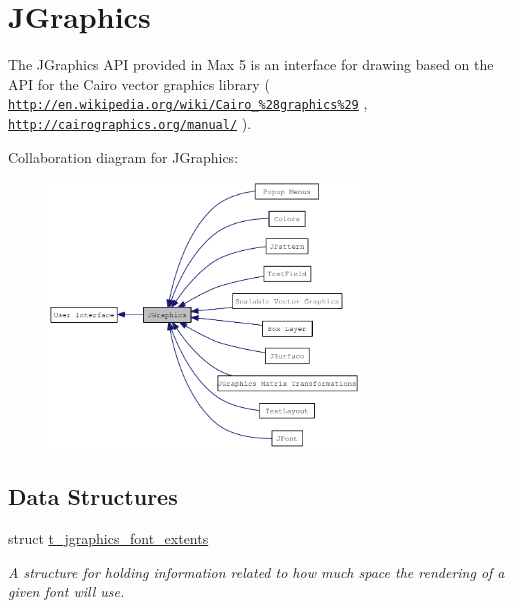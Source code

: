 \hypertarget{group__jgraphics}{
\section{JGraphics}
\label{group__jgraphics}
}


The JGraphics API provided in Max 5 is an interface for drawing based on the API for the Cairo vector graphics library ( \href{http://en.wikipedia.org/wiki/Cairo_%28graphics%29}{\tt http://en.wikipedia.org/wiki/Cairo\_\-\%28graphics\%29} , \href{http://cairographics.org/manual/}{\tt http://cairographics.org/manual/} ).  


Collaboration diagram for JGraphics:\nopagebreak
\begin{figure}[H]
\begin{center}
\leavevmode
\includegraphics[width=234pt]{group__jgraphics}
\end{center}
\end{figure}
\subsection*{Data Structures}
\begin{DoxyCompactItemize}
\item 
struct \hyperlink{structt__jgraphics__font__extents}{t\_\-jgraphics\_\-font\_\-extents}
\begin{DoxyCompactList}\small\item\em A structure for holding information related to how much space the rendering of a given font will use. \item\end{DoxyCompactList}\end{DoxyCompactItemize}
